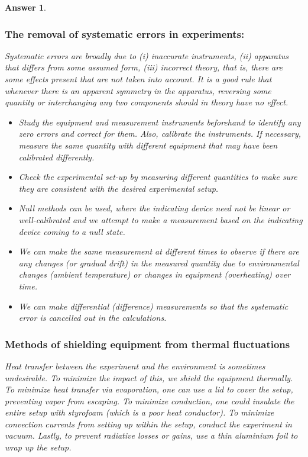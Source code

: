 \documentclass[a4paper]{article}
\newtheorem{ans}{Answer}[subsection]
\theoremstyle{new}
\begin{document}
\begin{ans}
\subsubsection*{The removal of systematic errors in experiments:}
Systematic errors are broadly due to (i) inaccurate instruments, (ii) apparatus that differs from some assumed form, (iii) incorrect theory, that is, there are some effects present that are not taken into account. It is a good rule that whenever there is an apparent symmetry in the apparatus, reversing some quantity or interchanging any two components should in theory have no effect.
\begin{itemize}
    \item Study the equipment and measurement instruments beforehand to identify any zero errors and correct for them. Also, calibrate the instruments. If necessary, measure the same quantity with different equipment that may have been calibrated differently.
    \item Check the experimental set-up by measuring different quantities to make sure they are consistent with the desired experimental setup.
    \item Null methods can be used, where the indicating device need not be linear or well-calibrated and we attempt to make a measurement based on the indicating device coming to a null state.
    \item We can make the same measurement at different times to observe if there are any changes (or gradual drift) in the measured quantity due to environmental changes (ambient temperature) or changes in equipment (overheating) over time.
    \item We can make differential (difference) measurements so that the systematic error is cancelled out in the calculations.
\end{itemize}
\subsubsection*{Methods of shielding equipment from thermal fluctuations}
Heat transfer between the experiment and the environment is sometimes undesirable. To minimize the impact of this, we shield the equipment thermally. To minimize heat transfer via evaporation, one can use a lid to cover the setup, preventing vapor from escaping. To minimize conduction, one could insulate the entire setup with styrofoam (which is a poor heat conductor). To minimize convection currents from setting up within the setup, conduct the experiment in vacuum. Lastly, to prevent radiative losses or gains, use a thin aluminium foil to wrap up the setup.
\end{ans}
\end{document}
